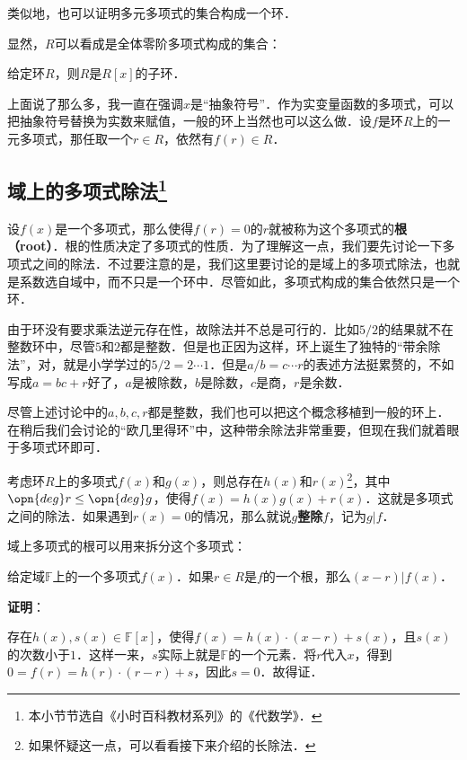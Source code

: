 类似地，也可以证明多元多项式的集合构成一个环．


显然，$R$可以看成是全体零阶多项式构成的集合：

\begin{exercise}{}
给定环$R$，则$R$是$R[x]$的子环．
\end{exercise}






上面说了那么多，我一直在强调$x$是“抽象符号”．作为实变量函数的多项式，可以把抽象符号替换为实数来赋值，一般的环上当然也可以这么做．设$f$是环$R$上的一元多项式，那任取一个$r\in R$，依然有$f(r)\in R$．




\subsection{域上的多项式除法\footnote{本小节节选自《小时百科教材系列》的《代数学》．}}

设$f(x)$是一个多项式，那么使得$f(r)=0$的$r$就被称为这个多项式的\textbf{根（root）}．根的性质决定了多项式的性质．为了理解这一点，我们要先讨论一下多项式之间的除法．不过要注意的是，我们这里要讨论的是域上的多项式除法，也就是系数选自域中，而不只是一个环中．尽管如此，多项式构成的集合依然只是一个环．

由于环没有要求乘法逆元存在性，故除法并不总是可行的．比如$5/2$的结果就不在整数环中，尽管$5$和$2$都是整数．但是也正因为这样，环上诞生了独特的“带余除法”，对，就是小学学过的$5/2=2\cdots 1$．但是$a/b=c\cdots r$的表述方法挺累赘的，不如写成$a=bc+r$好了，$a$是被除数，$b$是除数，$c$是商，$r$是余数．

尽管上述讨论中的$a, b, c, r$都是整数，我们也可以把这个概念移植到一般的环上．在稍后我们会讨论的“欧几里得环”中，这种带余除法非常重要，但现在我们就着眼于多项式环即可．

考虑环$R$上的多项式$f(x)$和$g(x)$，则总存在$h(x)$和$r(x)$\footnote{如果怀疑这一点，可以看看接下来介绍的长除法．}，其中$\opn{deg}r\leq\opn{deg}g$，使得$f(x)=h(x)g(x)+r(x)$．这就是多项式之间的除法．如果遇到$r(x)=0$的情况，那么就说$g$\textbf{整除}$f$，记为$g|f$．

域上多项式的根可以用来拆分这个多项式：

\begin{theorem}{}\label{RPlynm_the1}
给定域$\mathbb{F}$上的一个多项式$f(x)$．如果$r\in R$是$f$的一个根，那么$(x-r)|f(x)$．
\end{theorem}

\textbf{证明}：

存在$h(x), s(x)\in\mathbb{F}[x]$，使得$f(x)=h(x)\cdot(x-r)+s(x)$，且$s(x)$的次数小于$1$．这样一来，$s$实际上就是$\mathbb{F}$的一个元素．将$r$代入$x$，得到$0=f(r)=h(r)\cdot(r-r)+s$，因此$s=0$．故得证．

